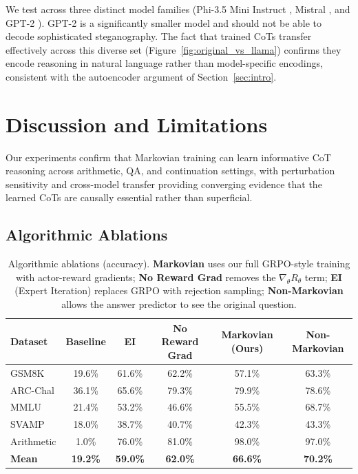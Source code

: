 \documentclass{article} %
\begin{document}
We test across three distinct model families (Phi-3.5 Mini Instruct \citep{abdin2024phi3technicalreporthighly}, Mistral \citep{jiang2023mistral}, and GPT-2 \citep{radford2019language}). GPT-2 is a significantly smaller model and should not be able to decode sophisticated steganography. The fact that trained CoTs transfer effectively across this diverse set (Figure~\ref{fig:original_vs_llama}) confirms they encode reasoning in natural language rather than model-specific encodings, consistent with the autoencoder argument of Section~\ref{sec:intro}.


\section{Discussion and Limitations}
\label{sec:disc}

Our experiments confirm that Markovian training can learn informative CoT reasoning across arithmetic, QA, and continuation settings, with perturbation sensitivity and cross-model transfer providing converging evidence that the learned CoTs are causally essential rather than superficial.

\subsection{Algorithmic Ablations}
\label{subsec:ablations}

\begin{table}[ht]
    \centering
    \caption{Algorithmic ablations (accuracy). \textbf{Markovian} uses our full GRPO-style training with actor-reward gradients; \textbf{No Reward Grad} removes the $\nabla_\theta R_\theta$ term; \textbf{EI} (Expert Iteration) replaces GRPO with rejection sampling; \textbf{Non-Markovian} allows the answer predictor to see the original question.}
    \label{tab:ablations}
    \small
    \begin{tabular}{lccccc}
        \toprule
        \textbf{Dataset} & \textbf{Baseline} & \textbf{EI} & \textbf{No Reward Grad} & \textbf{Markovian (Ours)} & \textbf{Non-Markovian} \\
        \midrule
        GSM8K & 19.6\% & 61.6\% & 62.2\% & 57.1\% & 63.3\% \\
        ARC-Chal & 36.1\% & 65.6\% & 79.3\% & 79.9\% & 78.6\% \\
        MMLU & 21.4\% & 53.2\% & 46.6\% & 55.5\% & 68.7\% \\
        SVAMP & 18.0\% & 38.7\% & 40.7\% & 42.3\% & 43.3\% \\
        Arithmetic & 1.0\% & 76.0\% & 81.0\% & 98.0\% & 97.0\% \\
        \midrule
        \textbf{Mean} & \textbf{19.2\%} & \textbf{59.0\%} & \textbf{62.0\%} & \textbf{66.6\%} & \textbf{70.2\%} \\
        \bottomrule
    \end{tabular}
\end{table}
\end{document}
